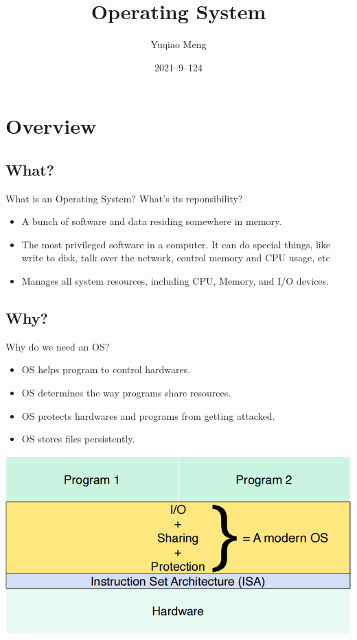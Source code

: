 \documentclass[12pt]{article}
\title{Operating System}
\author{Yuqiao Meng}
\date{2021–9–124}
\begin{document}
\maketitle

\newpage
\tableofcontents

\newpage

\section{Overview}

\subsection{What?}

What is an Operating System? What's its reponsibility?

\begin{itemize}
    \item A bunch of software and data residing somewhere in memory.
    \item The most privileged software in a computer. It  can do special things, like write to disk, talk over the network, control memory and CPU usage, etc
    \item Manages all system resources, including CPU, Memory, and I/O devices.
\end{itemize}

\subsection{Why?}
Why do we need an OS?
\begin{itemize}
    \item OS helps program to control hardwares.
    \item OS determines the way programs share resources.
    \item OS protects hardwares and programs from getting attacked.
    \item OS stores files persistently.
\end{itemize}
\includegraphics[width=1.0\textwidth]{WhyDoWeNeedOS.png}
\end{document}
